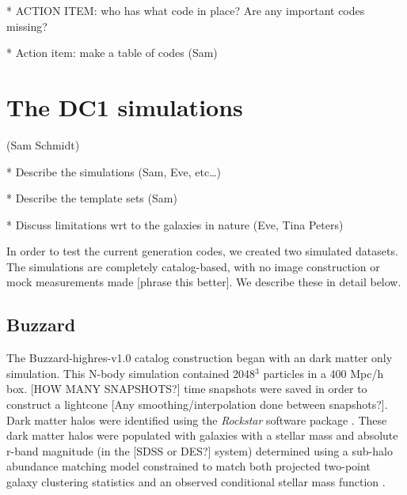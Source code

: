 \documentclass[usenatbib]{mn2e}
\begin{document}
* ACTION ITEM: who has what code in place? Are any important codes missing?

* Action item: make a table of codes (Sam)

\section{The DC1 simulations}\label{sims}

(Sam Schmidt)

* Describe the simulations (Sam, Eve, etc…)

* Describe the template sets (Sam)

* Discuss limitations wrt to the galaxies in nature (Eve, Tina Peters)

In order to test the current generation codes, we created two simulated datasets.  The simulations are completely catalog-based, with no image construction or mock measurements made [phrase this better].  We describe these in detail below.  

\subsection{Buzzard}\label{buzzard}

   The Buzzard-highres-v1.0 catalog construction began with an dark matter only simulation.  This N-body simulation contained 2048$^3$ particles in a 400 Mpc/h box.  [HOW MANY SNAPSHOTS?] time snapshots were saved in order to construct a lightcone [Any smoothing/interpolation done between snapshots?].  Dark matter halos were identified using the {\it Rockstar} software package \citep[]{Behroozi:13}.  These dark matter halos were populated with galaxies with a stellar mass and  absolute r-band magnitude (in the [SDSS or DES?] system) determined using a sub-halo abundance matching model constrained to match both projected two-point galaxy clustering statistics and an observed conditional stellar mass function \citep[]{Reddick:13}. 
\end{document}

